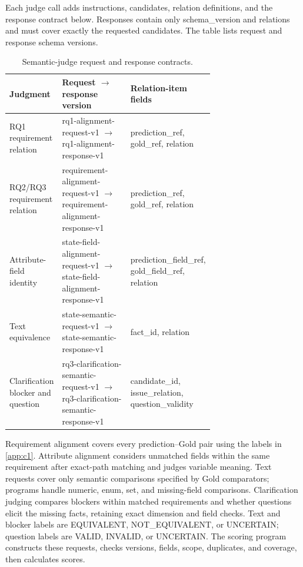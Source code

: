 \documentclass{article} %
\begin{document}
Each judge call adds instructions, candidates, relation definitions, and the response contract below. Responses contain only schema\_version and relations and must cover exactly the requested candidates. The table lists request and response schema versions.

\begin{table}[htbp]
\caption{Semantic-judge request and response contracts.}
\label{tab:judge-contracts}
\centering\normalsize
\setlength{\tabcolsep}{3pt}
\renewcommand{\arraystretch}{1.08}
\begin{tabularx}{\linewidth}{@{}>{\raggedright\arraybackslash}p{0.23\linewidth}>{\raggedright\arraybackslash}p{0.46\linewidth}>{\raggedright\arraybackslash}X@{}}
\toprule
Judgment & \shortstack[c]{Request \(\rightarrow\)\\response\\version} & \shortstack[c]{Relation-item\\fields} \\
\midrule
RQ1 requirement relation & rq1-alignment-request-v1 \(\rightarrow\) rq1-alignment-response-v1 & prediction\_ref, gold\_ref, relation \\
RQ2/RQ3 requirement relation & requirement-alignment-request-v1 \(\rightarrow\) requirement-alignment-response-v1 & prediction\_ref, gold\_ref, relation \\
Attribute-field identity & state-field-alignment-request-v1 \(\rightarrow\) state-field-alignment-response-v1 & prediction\_field\_ref, gold\_field\_ref, relation \\
Text equivalence & state-semantic-request-v1 \(\rightarrow\) state-semantic-response-v1 & fact\_id, relation \\
Clarification blocker and question & rq3-clarification-semantic-request-v1 \(\rightarrow\) rq3-clarification-semantic-response-v1 & candidate\_id, issue\_relation, question\_validity \\
\bottomrule
\end{tabularx}
\end{table}

Requirement alignment covers every prediction--Gold pair using the labels in \ref{app:c1}. Attribute alignment considers unmatched fields within the same requirement after exact-path matching and judges variable meaning. Text requests cover only semantic comparisons specified by Gold comparators; programs handle numeric, enum, set, and missing-field comparisons. Clarification judging compares blockers within matched requirements and whether questions elicit the missing facts, retaining exact dimension and field checks. Text and blocker labels are EQUIVALENT, NOT\_EQUIVALENT, or UNCERTAIN; question labels are VALID, INVALID, or UNCERTAIN. The scoring program constructs these requests, checks versions, fields, scope, duplicates, and coverage, then calculates scores.
\end{document}
